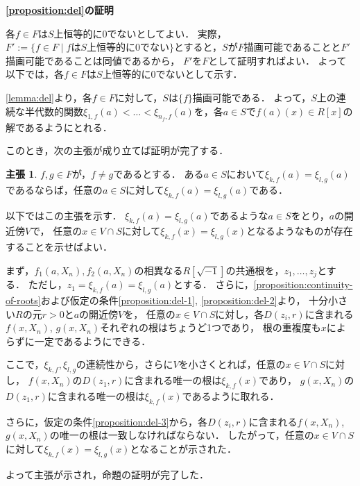 \documentclass[uplatex, dvipdfmx]{jsarticle}
\makeatletter
\numberwithin{equation}{section}
\renewenvironment{proof}[1][\proofname]{\par
  \pushQED{\qed}%
  \normalfont \topsep6\p@\@plus6\p@\relax
  \trivlist
  \item\relax
  {\bfseries
  #1\@addpunct{.}}\hspace\labelsep\ignorespaces
}{
  \popQED\endtrivlist\@endpefalse
}
\theoremstyle{definition}
\newtheorem*{claim*}{主張}
\renewcommand{\proofname}{\textbf{証明}}
\makeatother
\begin{document}
\begin{proof}[{\bf \cref{proposition:del}の証明}]
     各$f \in F$は$S$上恒等的に$0$でないとしてよい．
     実際，$F' := \{f \in F \mid \text{$f$は$S$上恒等的に$0$でない}\}$とすると，$S$が$F$描画可能であることと$F'$描画可能であることは同値であるから，
     $F'$を$F$として証明すればよい．
     よって以下では，各$f \in F$は$S$上恒等的に$0$でないとして示す．

     \cref{lemma:del}より，各$f \in F$に対して，$S$は$\{f\}$描画可能である．
     よって，$S$上の連続な半代数的関数$\xi_{1,f}(a) < \dots < \xi_{n_f, f}(a)$を，各$a \in S$で$f(a)(x) \in R[x]$の解であるようにとれる．

     このとき，次の主張が成り立てば証明が完了する．

     \begin{claim*}
          $f, g \in F$が，$f \neq g$であるとする．
          ある$a \in S$において$\xi_{k,f}(a) = \xi_{l,g}(a)$であるならば，任意の$a \in S$に対して$\xi_{k,f}(a) = \xi_{l,g}(a)$である．
     \end{claim*}

     以下ではこの主張を示す．
     $\xi_{k,f}(a) = \xi_{l, g}(a)$であるような$a \in S$をとり，$a$の開近傍$V$で，
     任意の$x \in V \cap S$に対して$\xi_{k,f}(x) = \xi_{l,g}(x)$となるようなものが存在することを示せばよい．

     まず，$f_1(a, X_n), f_2(a, X_n)$の相異なる$R\left[\sqrt{-1}\right]$の共通根を，$z_1, \dots, z_j$とする．
     ただし，$z_1 = \xi_{k,f}(a)=\xi_{l,g}(a)$とする．
     さらに，\cref{proposition:continuity-of-roots}および仮定の条件\ref{proposition:del-1}, \ref{proposition:del-2}より，
     十分小さい$R$の元$r>0$と$a$の開近傍$V$を，
     任意の$x \in V \cap S$に対し，各$D(z_i, r)$に含まれる$f(x, X_n)$, $g(x, X_n)$それぞれの根はちょうど1つであり，
     根の重複度も$x$によらずに一定であるようにできる．

     ここで，$\xi_{k,f}, \xi_{l, g}$の連続性から，さらに$V$を小さくとれば，任意の$x \in V \cap S$に対し，
     $f(x, X_n)$の$D(z_1, r)$に含まれる唯一の根は$\xi_{k,f}(x)$であり，
     $g(x, X_n)$の$D(z_1, r)$に含まれる唯一の根は$\xi_{k,f}(x)$であるように取れる．

     さらに，仮定の条件\ref{proposition:del-3}から，各$D(z_i, r)$に含まれる$f(x, X_n)$, $g(x, X_n)$の唯一の根は一致しなければならない．
     したがって，任意の$x \in V \cap S$に対して$\xi_{k, f}(x) = \xi_{l, g}(x)$となることが示された．

     よって主張が示され，命題の証明が完了した．
\end{proof}
\end{document}
